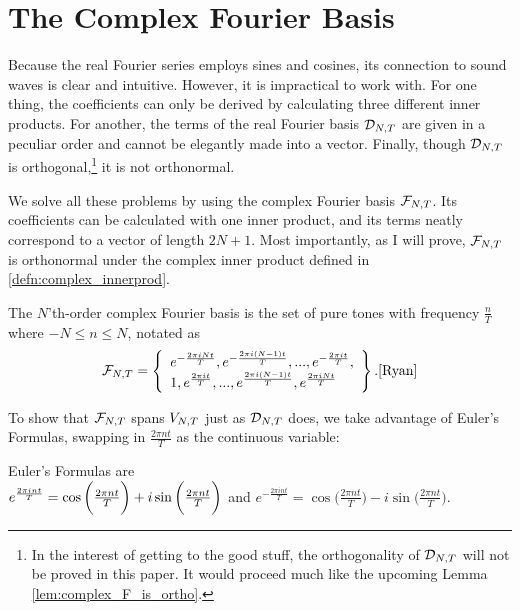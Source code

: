 
\section{The Complex Fourier Basis}

\par \indentt Because the real Fourier series employs sines and cosines, its connection to sound waves is clear and intuitive. However, it is impractical to work with. For one thing, the coefficients can only be derived by calculating three different inner products. For another, the terms of the real Fourier basis $\mathcal{D}_{N,T}$ are given in a peculiar order and cannot be elegantly made into a vector. Finally, though $\mathcal{D}_{N,T}$ is orthogonal,\footnote{In the interest of getting to the good stuff, the orthogonality of $\mathcal{D}_{N,T}$ will not be proved in this paper. It would proceed much like the upcoming Lemma \ref{lem:complex_F_is_ortho}.} it is not orthonormal. 

\par \bigskip We solve all these problems by using the complex Fourier basis $\mathcal{F}_{N,T}$. Its coefficients can be calculated with one inner product, and its terms neatly correspond to a vector of length $2N+1$. Most importantly, as I will prove, $\mathcal{F}_{N,T}$ is orthonormal under the complex inner product defined in \ref{defn:complex_innerprod}.

\begin{definition}{The $N$'th-order complex Fourier basis is the set of pure tones with frequency $\frac{n}{T}$ where $-N\le n \le N$, notated as}
    \[\mathcal{F}_{N,T}= \left\{\begin{array}{ll}
   e^{-\frac{2\pi iNt}{T}},e^{-\frac{2\pi i(N-1)t}{T}}, ..., e^{-\frac{2\pi it}{T}}, \\
   1,e^{\frac{2\pi it}{T}}, ..., e^{\frac{2\pi i(N-1)t}{T}}, e^{\frac{2\pi iNt}{T}}
   \end{array}\right\}.\cite{Ryan}
   \]
   \label{defn:complex_F_basis}
\end{definition}

\par To show that $\mathcal{F}_{N,T}$ spans $V_{N,T}$ just as $\mathcal{D}_{N,T}$ does, we take advantage of Euler's Formulas, swapping in $\frac{2\pi nt}{T}$ as the continuous variable:

\begin{definition}
    Euler's Formulas are\\
    
    $e^{\frac{2 \pi i nt}{T}} = \cos\bigg(\frac{2\pi nt}{T}\bigg)+i\sin\bigg(\frac{2\pi nt}{T}\bigg)$ \hspace{.3in} and \hspace{.3in} $e^{-\frac{2\pi int}{T}} = \cos\bigg(\frac{2\pi nt}{T}\bigg)-i\sin\bigg(\frac{2\pi nt}{T}\bigg)$.
\end{definition}

